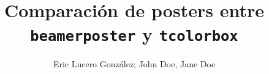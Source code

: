 \documentclass[final]{beamer}
\title{Comparación de posters entre \texttt{beamerposter} y \texttt{tcolorbox}} %
\author{Eric Lucero González; John Doe, Jane Doe} %
\institute{elcronopio.com/latex} %
\begin{document}
\begin{frame}[t] %
    \begin{columns}[t] %
        \begin{column}{\sepwid}\end{column} %
        \begin{column}{\onecolwid} %
            
            
        \end{column} %
        \begin{column}{\sepwid}\end{column} %

        \begin{column}{\twocolwid} %

            \begin{columns}[t,totalwidth=\twocolwid] %
                \begin{column}{\onecolwid}\vspace{-.6in} %
                    
                \end{column} %


\end{columns}
\end{column}
\end{columns}
\end{frame}
\end{document}
